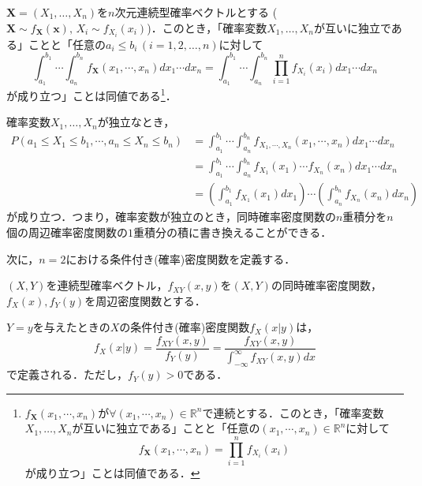 \documentclass{jsreport}
\begin{document}
$\bm{X} = (X_1, \ldots, X_n)$を$n$次元連続型確率ベクトルとする ($\bm{X} \sim f_{\bm{X}}(\bm{x}), \, X_i \sim f_{X_i}(x_i)$)．このとき，「確率変数$X_1, \ldots, X_n$が互いに独立である」ことと「任意の$a_i \leq b_i \, (i = 1, 2, \ldots, n)$に対して
\begin{equation}
  \int_{a_1}^{b_1} \cdots \int_{a_n}^{b_n} f_{\bm{X}}(x_1, \cdots, x_n) dx_1 \cdots dx_n = \int_{a_1}^{b_1} \cdots \int_{a_n}^{b_n} \prod_{i = 1}^n f_{X_i}(x_i) dx_1 \cdots dx_n \nonumber
\end{equation}
が成り立つ」ことは同値である\footnote{
$f_{\bm{X}}(x_1, \cdots, x_n)$が$\forall (x_1, \cdots, x_n) \in \mathbb{R}^n$で連続とする．このとき，「確率変数$X_1, \ldots, X_n$が互いに独立である」ことと「任意の$(x_1, \cdots, x_n) \in \mathbb{R}^n$に対して
\begin{equation}
  f_{\bm{X}}(x_1, \cdots, x_n) = \prod_{i = 1}^n f_{X_i}(x_i) \nonumber
\end{equation}
が成り立つ」ことは同値である．
}．

確率変数$X_1, \ldots, X_n$が独立なとき，
\begin{align}
  P(a_1 \leq X_1 \leq b_1, \cdots, a_n \leq X_n \leq b_n) &= \int_{a_1}^{b_1} \cdots \int_{a_n}^{b_n} f_{X_1, \cdots, X_n}(x_1, \cdots, x_n) dx_1 \cdots dx_n \nonumber \\
  &= \int_{a_1}^{b_1} \cdots \int_{a_n}^{b_n} f_{X_1}(x_1) \cdots f_{X_n}(x_n) dx_1 \cdots dx_n \nonumber \\
  &= \left(\int_{a_1}^{b_1} f_{X_1}(x_1) dx_1\right) \cdots \left(\int_{a_n}^{b_n} f_{X_n}(x_n) dx_n\right) \nonumber
\end{align}
が成り立つ．つまり，確率変数が独立のとき，同時確率密度関数の$n$重積分を$n$個の周辺確率密度関数の$1$重積分の積に書き換えることができる．

次に，$n = 2$における条件付き(確率)密度関数を定義する．
\begin{screen}
  \begin{defi}[条件付き密度関数]
    $(X, Y)$を連続型確率ベクトル，$f_{XY}(x, y)$を$(X, Y)$の同時確率密度関数，$f_{X}(x), f_{Y}(y)$を周辺密度関数とする．

    $Y = y$を与えたときの$X$の条件付き(確率)密度関数$f_{X}(x|y)$は，
    \begin{equation}
      f_{X}(x|y) = \frac{f_{XY}(x, y)}{f_{Y}(y)} = \frac{f_{XY}(x, y)}{\int_{-\infty}^{\infty} f_{XY} (x, y)dx} \nonumber
    \end{equation}
    で定義される．ただし，$f_{Y}(y) > 0$である．
  \end{defi}
\end{screen}
\end{document}
